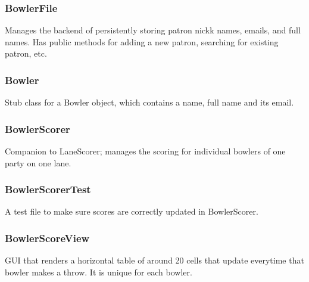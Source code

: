 \subsubsection{BowlerFile}
Manages the backend of persistently storing patron nickk names, emails, and full names. Has public methods for adding a new patron, searching for existing patron, etc.

\subsubsection{Bowler}
Stub class for a Bowler object, which contains a name, full name and its email.

\subsubsection{BowlerScorer}
Companion to LaneScorer; manages the scoring for individual bowlers of one party on one lane.

\subsubsection{BowlerScorerTest}
A test file to make sure scores are correctly updated in BowlerScorer.

\subsubsection{BowlerScoreView}
GUI that renders a horizontal table of around 20 cells that update everytime that bowler makes a throw. It is unique for each bowler.
